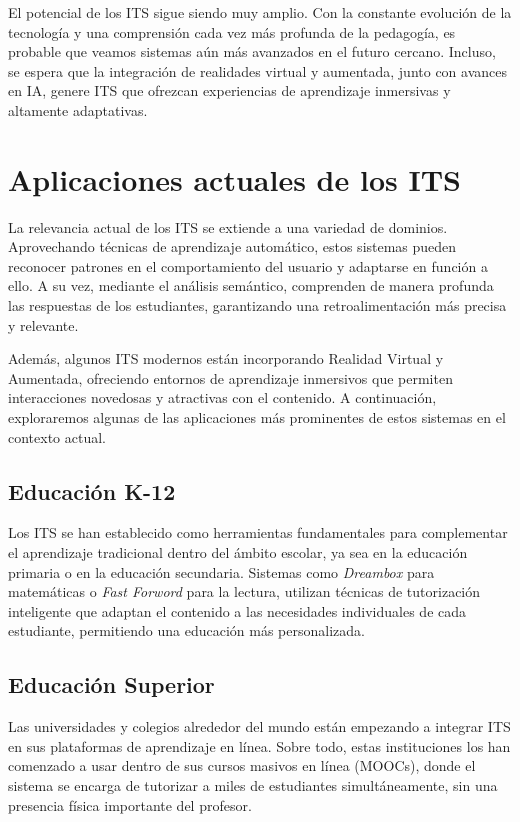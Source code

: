 El potencial de los ITS sigue siendo muy amplio. Con la constante evolución de la tecnología y una comprensión cada vez más profunda de la pedagogía, es probable que veamos sistemas aún más avanzados en el futuro cercano. Incluso, se espera que la integración de realidades virtual y aumentada, junto con avances en IA, genere ITS que ofrezcan experiencias de aprendizaje inmersivas y altamente adaptativas. 

\section{Aplicaciones actuales de los ITS}

La relevancia actual de los ITS se extiende a una variedad de dominios. Aprovechando técnicas de aprendizaje automático, estos sistemas pueden reconocer patrones en el comportamiento del usuario y adaptarse en función a ello. A su vez, mediante el análisis semántico, comprenden de manera profunda las respuestas de los estudiantes, garantizando una retroalimentación más precisa y relevante. 

Además, algunos ITS modernos están incorporando Realidad Virtual y Aumentada, ofreciendo entornos de aprendizaje inmersivos que permiten interacciones novedosas y atractivas con el contenido. A continuación, exploraremos algunas de las aplicaciones más prominentes de estos sistemas en el contexto actual.

\subsection{Educación K-12}

Los ITS se han establecido como herramientas fundamentales para complementar el aprendizaje tradicional dentro del ámbito escolar, ya sea en la educación primaria o en la educación secundaria. Sistemas como \textit{Dreambox} \cite{dreambox} para matemáticas o \textit{Fast Forword} \cite{fastforword} para la lectura, utilizan técnicas de tutorización inteligente que adaptan el contenido a las necesidades individuales de cada estudiante, permitiendo una educación más personalizada.

\subsection{Educación Superior}

Las universidades y colegios alrededor del mundo están empezando a integrar ITS en sus plataformas de aprendizaje en línea. Sobre todo, estas instituciones los han comenzado a usar dentro de sus cursos masivos en línea (MOOCs), donde el sistema se encarga de tutorizar a miles de estudiantes simultáneamente, sin una presencia física importante del profesor.

